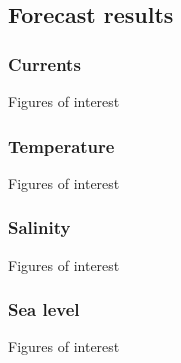 \subsection{Forecast results}

\subsubsection{Currents}
Figures of interest 





\subsubsection{Temperature}
Figures of interest 

\subsubsection{Salinity}
Figures of interest 

\subsubsection{Sea level}
Figures of interest 



